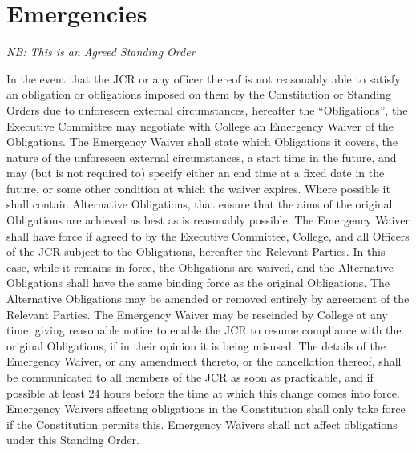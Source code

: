 \chapter{Emergencies}
\textit{NB: This is an Agreed Standing Order}

\npara In the event that the JCR or any officer thereof is not reasonably able to satisfy an obligation or obligations imposed on them by the Constitution or Standing Orders due to unforeseen external circumstances, hereafter the ``Obligations'', the Executive Committee may negotiate with College an Emergency Waiver of the Obligations.
\npara The Emergency Waiver shall state which Obligations it covers, the nature of the unforeseen external circumstances, a start time in the future, and may (but is not required to) specify either an end time at a fixed date in the future, or some other condition at which the waiver expires. Where possible it shall contain Alternative Obligations, that ensure that the aims of the original Obligations are achieved as best as is reasonably possible.
\npara The Emergency Waiver shall have force if agreed to by the Executive Committee, College, and all Officers of the JCR subject to the Obligations, hereafter the Relevant Parties. In this case, while it remains in force, the Obligations are waived, and the Alternative Obligations shall have the same binding force as the original Obligations.
\npara The Alternative Obligations may be amended or removed entirely by agreement of the Relevant Parties.
\npara The Emergency Waiver may be rescinded by College at any time, giving reasonable notice to enable the JCR to resume compliance with the original Obligations, if in their opinion it is being misused.
\npara The details of the Emergency Waiver, or any amendment thereto, or the cancellation thereof, shall be communicated to all members of the JCR as soon as practicable, and if possible at least 24 hours before the time at which this change comes into force.
\npara Emergency Waivers affecting obligations in the Constitution shall only take force if the Constitution permits this.
\npara Emergency Waivers shall not affect obligations under this Standing Order.